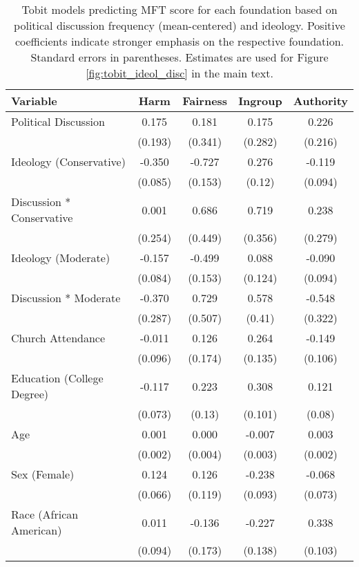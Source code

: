 \begin{table}[ht]
\centering
\caption{Tobit models predicting MFT score for each foundation based 
           on political discussion frequency (mean-centered) and ideology. Positive coefficients 
           indicate stronger emphasis on the respective foundation. Standard errors in parentheses. 
           Estimates are used for Figure \ref{fig:tobit_ideol_disc} in the main text.} 
\label{tab:tobit_ideol_disc}
\begingroup\footnotesize
\begin{tabular}{lcccc}
  \hline
Variable & Harm & Fairness & Ingroup & Authority \\ 
  \hline
Political Discussion &  0.175 &  0.181 &  0.175 &  0.226 \\ 
   & (0.193) & (0.341) & (0.282) & (0.216) \\ 
  Ideology (Conservative) & -0.350 & -0.727 &  0.276 & -0.119 \\ 
   & (0.085) & (0.153) & (0.12) & (0.094) \\ 
  Discussion * Conservative &  0.001 &  0.686 &  0.719 &  0.238 \\ 
   & (0.254) & (0.449) & (0.356) & (0.279) \\ 
  Ideology (Moderate) & -0.157 & -0.499 &  0.088 & -0.090 \\ 
   & (0.084) & (0.153) & (0.124) & (0.094) \\ 
  Discussion * Moderate & -0.370 &  0.729 &  0.578 & -0.548 \\ 
   & (0.287) & (0.507) & (0.41) & (0.322) \\ 
  Church Attendance & -0.011 &  0.126 &  0.264 & -0.149 \\ 
   & (0.096) & (0.174) & (0.135) & (0.106) \\ 
  Education (College Degree) & -0.117 &  0.223 &  0.308 &  0.121 \\ 
   & (0.073) & (0.13) & (0.101) & (0.08) \\ 
  Age &  0.001 &  0.000 & -0.007 &  0.003 \\ 
   & (0.002) & (0.004) & (0.003) & (0.002) \\ 
  Sex (Female) &  0.124 &  0.126 & -0.238 & -0.068 \\ 
   & (0.066) & (0.119) & (0.093) & (0.073) \\ 
  Race (African American) &  0.011 & -0.136 & -0.227 &  0.338 \\ 
   & (0.094) & (0.173) & (0.138) & (0.103) \\ 

\end{tabular}
\end{table}
